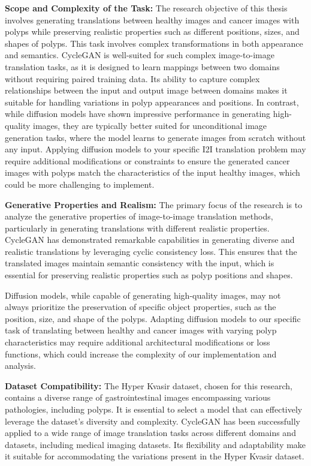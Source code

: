 \documentclass[UKenglish,12pt]{master-style}
\begin{document}
\textbf{Scope and Complexity of the Task:}
The research objective of this thesis involves generating translations between healthy images and cancer images with polyps while preserving realistic properties such as different positions, sizes, and shapes of polyps. This task involves complex transformations in both appearance and semantics.
CycleGAN is well-suited for such complex image-to-image translation tasks, as it is designed to learn mappings between two domains without requiring paired training data. Its ability to capture  complex relationships between the input and output image between domains makes it suitable for handling variations in polyp appearances and positions.
In contrast, while diffusion models have shown impressive performance in generating high-quality images, they are typically better suited for unconditional image generation tasks, where the model learns to generate images from scratch without any input. Applying diffusion models to your specific I2I translation problem may require additional modifications or constraints to ensure the generated cancer images with polyps match the characteristics of the input healthy images, which could be more challenging to implement.

\textbf{Generative Properties and Realism:}
The primary focus of the research is to analyze the generative properties of image-to-image translation methods, particularly in generating translations with different realistic properties.
CycleGAN has demonstrated remarkable capabilities in generating diverse and realistic translations by leveraging cyclic consistency loss. This ensures that the translated images maintain semantic consistency with the input, which is essential for preserving realistic properties such as polyp positions and shapes.

Diffusion models, while capable of generating high-quality images, may not always prioritize the preservation of specific object properties, such as the position, size, and shape of the polyps. Adapting diffusion models to our specific task of translating between healthy and cancer images with varying polyp characteristics may require additional architectural modifications or loss functions, which could increase the complexity of our implementation and analysis.

\textbf{Dataset Compatibility:}
The Hyper Kvasir dataset, chosen for this research, contains a diverse range of gastrointestinal images encompassing various pathologies, including polyps. It is essential to select a model that can effectively leverage the dataset's diversity and complexity.
CycleGAN has been successfully applied to a wide range of image translation tasks across different domains and datasets, including medical imaging datasets. Its flexibility and adaptability make it suitable for accommodating the variations present in the Hyper Kvasir dataset.
\end{document}
